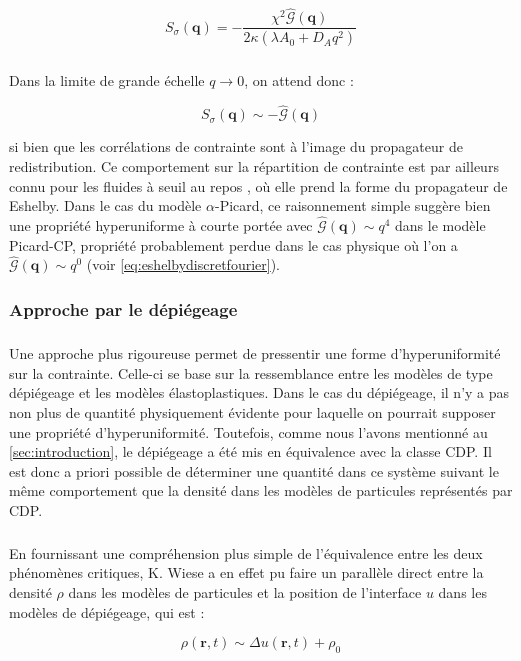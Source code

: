 \begin{equation}
    S_{\sigma}(\mathbf{q}) = -\frac{\chi^2\hat{\mathcal{G}}(\bm{q})}{2\kappa(\lambda A_0 + D_A q^2)}
\end{equation}

\subparagraph{}Dans la limite de grande échelle $q\rightarrow 0$, on attend donc :

\begin{equation}
    S_{\sigma}(\mathbf{q}) \sim -\hat{\mathcal{G}}(\bm{q})
\end{equation}

\noindent si bien que les corrélations de contrainte sont à l'image du propagateur de redistribution. Ce comportement sur la répartition de contrainte est par ailleurs connu pour les fluides à seuil au repos \cite{lerner_simple_2020}, où elle prend la forme du propagateur de Eshelby. Dans le cas du modèle $\alpha$-Picard, ce raisonnement simple suggère bien une propriété hyperuniforme à courte portée avec $\hat{\mathcal{G}}(\bm{q})\sim q^4$ dans le modèle Picard-CP, propriété probablement perdue dans le cas physique où l'on a $\hat{\mathcal{G}}(\bm{q})\sim q^0$ (voir \autoref{eq:eshelbydiscretfourier}).

\subsubsection{Approche par le dépiégeage}

\subparagraph{}Une approche plus rigoureuse permet de pressentir une forme d'hyperuniformité sur la contrainte. Celle-ci se base sur la ressemblance entre les modèles de type dépiégeage et les modèles élastoplastiques. Dans le cas du dépiégeage, il n'y a pas non plus de quantité physiquement évidente pour laquelle on pourrait supposer une propriété d'hyperuniformité. Toutefois, comme nous l'avons mentionné au \autoref{sec:introduction}, le dépiégeage a été mis en équivalence avec la classe CDP. Il est donc a priori possible de déterminer une quantité dans ce système suivant le même comportement que la densité dans les modèles de particules représentés par CDP. 

\subparagraph{}En fournissant une compréhension plus simple de l'équivalence entre les deux phénomènes critiques, K. Wiese \cite{wiese_hyperuniformity_2024} a en effet pu faire un parallèle direct entre la densité $\rho$ dans les modèles de particules et la position de l'interface $u$ dans les modèles de dépiégeage, qui est :

\begin{equation}
	\rho(\mathbf{r},t) \sim \Delta u(\mathbf{r},t) + \rho_0
\end{equation}

